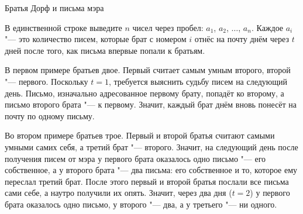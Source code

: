 \begin{problem}{Братья Дорф и письма мэра}
\OutputFile

В единственной строке выведите $n$ чисел через пробел:
$a_1$, $a_2$, $\ldots$, $a_n$.
Каждое $a_i$ "--- это количество писем, которые брат с номером $i$
отнёс на почту днём через $t$ дней после того, как письма впервые
попали к братьям.

\Examples

\begin{example}
%
%
\end{example}

\Explanations

В первом примере братьев двое.
Первый считает самым умным второго, второй "--- первого.
Поскольку $t = 1$, требуется выяснить судьбу писем на следующий день.
Письмо, изначально адресованное первому брату, попадёт ко второму,
а письмо второго брата "--- к первому.
Значит, каждый брат днём вновь понесёт на почту по одному письму.

Во втором примере братьев трое.
Первый и второй братья считают самыми умными самих себя,
а третий брат "--- второго.
Значит, на следующий день после получения писем от мэра
у первого брата оказалось одно письмо "--- его собственное,
а у второго брата "--- два письма: его собственное и то,
которое ему переслал третий брат.
После этого первый и второй братья послали все письма сами себе,
а наутро получили их опять.
Значит, через два дня ($t = 2$) у первого брата оказалось одно письмо,
у второго "--- два, а у третьего "--- ни одного.

\end{problem}
